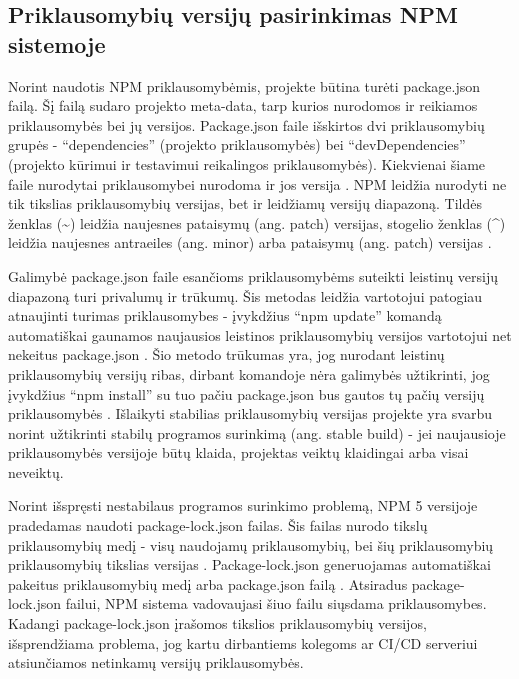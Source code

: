 \subsection{Priklausomybių versijų pasirinkimas NPM sistemoje}

Norint naudotis NPM priklausomybėmis, projekte būtina turėti package.json failą. Šį failą
sudaro projekto meta-data, tarp kurios nurodomos ir reikiamos priklausomybės bei jų versijos. Package.json
faile išskirtos dvi priklausomybių grupės - \enquote{dependencies} (projekto priklausomybės) bei \enquote{devDependencies}
(projekto kūrimui ir testavimui reikalingos priklausomybės). Kiekvienai šiame faile nurodytai priklausomybei nurodoma ir jos versija \cite{GAU18}.
NPM leidžia nurodyti ne tik tikslias priklausomybių versijas, bet ir leidžiamų versijų diapazoną.
Tildės ženklas (\textasciitilde) leidžia naujesnes pataisymų (ang. patch) versijas,
stogelio ženklas (\textasciicircum) leidžia naujesnes antraeiles (ang. minor) arba pataisymų (ang. patch) versijas \cite{PIT15}.


Galimybė package.json faile esančioms priklausomybėms suteikti leistinų versijų diapazoną turi privalumų ir trūkumų.
Šis metodas leidžia vartotojui patogiau atnaujinti turimas priklausomybes - įvykdžius
\enquote{npm update} komandą automatiškai gaunamos naujausios leistinos priklausomybių versijos vartotojui net
nekeitus package.json \cite{PIT15}. Šio metodo trūkumas yra, jog nurodant leistinų priklausomybių versijų ribas,
dirbant komandoje nėra galimybės užtikrinti, jog įvykdžius \enquote{npm install} su tuo pačiu package.json bus gautos
tų pačių versijų priklausomybės \cite{PIT15}. Išlaikyti stabilias priklausomybių versijas projekte yra svarbu norint
užtikrinti stabilų programos surinkimą (ang. stable build) - jei naujausioje priklausomybės versijoje būtų
klaida, projektas veiktų klaidingai arba visai neveiktų.

Norint išspręsti nestabilaus programos surinkimo problemą, NPM 5 versijoje pradedamas naudoti
package-lock.json failas. Šis failas nurodo tikslų priklausomybių medį - visų naudojamų priklausomybių,
bei šių priklausomybių priklausomybių tikslias versijas \cite{NPMc}. Package-lock.json generuojamas automatiškai pakeitus priklausomybių medį
arba package.json failą \cite{NPMc}. Atsiradus package-lock.json failui, NPM sistema vadovaujasi šiuo failu siųsdama priklausomybes.
Kadangi package-lock.json įrašomos tikslios priklausomybių versijos, išsprendžiama problema,
jog kartu dirbantiems kolegoms ar CI/CD serveriui atsiunčiamos netinkamų versijų priklausomybės.
